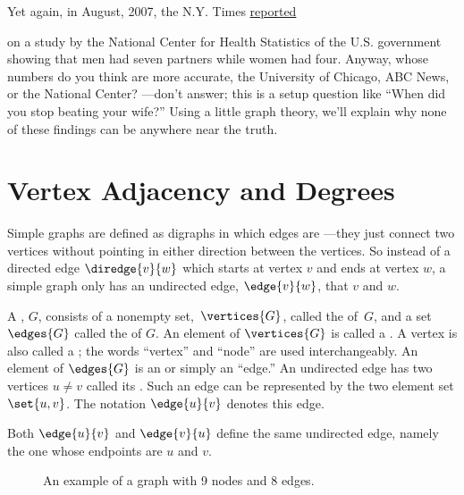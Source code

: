 Yet again, in August, 2007, the N.Y. Times
\href{The-Myth-the-Math-the-Sex.pdf}{reported}
\iffalse
\href{http://www.nytimes.com/2007/08/12/weekinreview/12kolata.html?_r=1&n=Top/Reference/Times%20Topics/People/K/Kolata,%20Gina&oref=slogin}{reported}
\fi
on a study by the National Center for Health Statistics of the U.S. government
showing that men had seven partners while women had four.  Anyway, whose numbers do
you think are more accurate, the University of Chicago, ABC News, or the National
Center? ---don't answer; this is a setup question like ``When did you stop beating
your wife?''  Using a little graph theory, we'll explain why none of these findings
can be anywhere near the truth.

\section{Vertex Adjacency and Degrees}\label{degreessec}

Simple graphs are defined as digraphs in which edges are
 ---they just connect two vertices without pointing
in either direction between the vertices.  So instead of a directed
edge $\diredge{v}{w}$ which starts at vertex $v$ and ends at vertex
$w$, a simple graph only has an undirected edge, $\edge{v}{w}$, that
 $v$ and $w$.

\begin{definition}\label{simplegraphdef}
  A , $G$, consists of a nonempty
  set,~$\vertices{G}$, called the  of~$G$, and a set
  $\edges{G}$ called the  of $G$.  An element of
  $\vertices{G}$ is called a .  A vertex is also called a
  ; the words ``vertex'' and ``node'' are used
  interchangeably.  An element of $\edges{G}$ is an  or simply an ``edge.''  An undirected edge has two vertices
  $u\neq v$ called its .  Such an edge can be
  represented by the two element set $\set{u,v}$.  The notation
  $\edge{u}{v}$ denotes this edge.
\end{definition}
Both $\edge{u}{v}$ and $\edge{v}{u}$ define the same undirected edge,
namely the one whose endpoints are $u$ and $v$.

\begin{figure}[h]


\caption{An example of a graph with 9 nodes and 8 edges.}

\label{fig:graph-example}

\end{figure}

